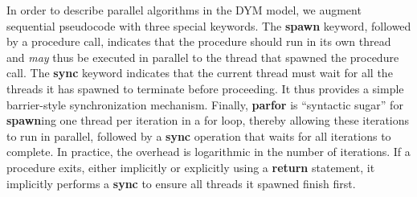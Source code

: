 In order to describe parallel algorithms in the DYM model, we augment sequential
pseudocode with three special keywords.
The {\bf spawn} keyword, followed by a procedure call, indicates that the
procedure should run in its own thread and {\em may} thus be executed in parallel
to the thread that spawned the procedure call.
The {\bf sync} keyword indicates that the current thread must wait for all the
threads it has spawned to terminate before proceeding.
It thus provides a simple barrier-style synchronization mechanism.
Finally, {\bf parfor} is ``syntactic sugar'' for {\bf spawn}ing one thread per
iteration in a for loop, thereby allowing these iterations to run in parallel,
followed by a {\bf sync} operation that waits for all iterations to complete.
In practice, the overhead is logarithmic in the number of iterations.
If a procedure exits, either implicitly or explicitly using a {\bf return}
statement, it implicitly performs a {\bf sync} to ensure all threads it spawned
finish first.
